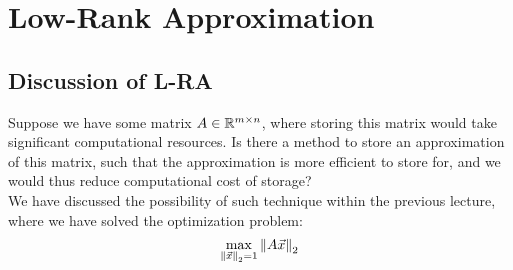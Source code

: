 \chapter{Low-Rank Approximation}

\section{Discussion of L-RA}
Suppose we have some matrix $A \in \mathbb{R}^{m \times n}$, where storing this matrix would take significant computational resources.
Is there a method to store an approximation of this matrix, such that the approximation is more efficient to store for, and we would thus reduce computational cost of storage? \\
We have discussed the possibility of such technique within the previous lecture, where we have solved the optimization problem:
\[\max_{{\| \vec{x} \|}_{2}^{} = 1} {\| A \vec{x} \|}_{2}^{}\]

